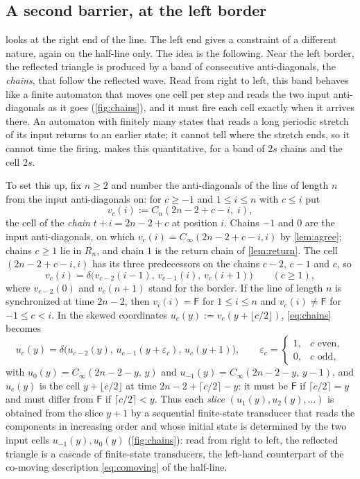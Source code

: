 \subsection{A second barrier, at the left border}\label{sec:leftborder}

 looks at the right end of the line. The left end gives a
constraint of a different nature, again on the half-line only. The idea is
the following. Near the left border, the reflected triangle is produced by
a band of consecutive anti-diagonals, the \emph{chains}, that follow the
reflected wave. Read from right to left, this band behaves like a finite
automaton that moves one cell per step and reads the two input
anti-diagonals as it goes (\cref{fig:chains}), and it must fire each cell
exactly when it arrives there. An automaton with finitely many states that
reads a long periodic stretch of its input returns to an earlier state; it
cannot tell where the stretch ends, so it cannot time the firing.
 makes this quantitative, for a band of $2s$ chains and the
cell $2s$.

To set this up, fix $n\ge2$ and number the anti-diagonals of the line of
length $n$ from the input anti-diagonals on: for $c\ge-1$ and $1\le i\le n$ with $c\le i$ put
\[
v_c(i):=C_n(2n-2+c-i,\;i),
\]
the cell of the \emph{chain} $t+i=2n-2+c$ at position $i$. Chains $-1$ and
$0$ are the input anti-diagonals, on which $v_c(i)=C_\infty(2n-2+c-i,i)$ by
\cref{lem:agree}; chains $c\ge1$ lie in $R_n$, and chain $1$ is the return
chain of \cref{lem:return}. The cell $(2n-2+c-i,i)$ has its three
predecessors on the chains $c-2$, $c-1$ and $c$, so
\begin{equation}\label{eq:chains}
v_c(i)=\delta\bigl(v_{c-2}(i-1),\,v_{c-1}(i),\,v_c(i+1)\bigr)\qquad(c\ge1),
\end{equation}
where $v_{c-2}(0)$ and $v_c(n+1)$ stand for the border. If the line of
length $n$ is synchronized at time $2n-2$, then $v_i(i)=\mathsf F$ for
$1\le i\le n$ and $v_c(i)\ne\mathsf F$ for $-1\le c<i$. In the skewed coordinates
$u_c(y):=v_c(y+\lfloor c/2\rfloor)$, \eqref{eq:chains} becomes
\begin{equation}\label{eq:slices}
u_c(y)=\delta\bigl(u_{c-2}(y),\,u_{c-1}(y+\varepsilon_c),\,u_c(y+1)\bigr),
\qquad \varepsilon_c=\begin{cases}1,&c\text{ even},\\0,&c\text{ odd},\end{cases}
\end{equation}
with $u_0(y)=C_\infty(2n-2-y,\,y)$ and $u_{-1}(y)=C_\infty(2n-2-y,\,y-1)$,
and $u_c(y)$ is the cell $y+\lfloor c/2\rfloor$ at time
$2n-2+\lceil c/2\rceil-y$: it must be $\mathsf F$ if $\lceil c/2\rceil=y$
and must differ from $\mathsf F$ if $\lceil c/2\rceil<y$. Thus each \emph{slice}
$(u_1(y),u_2(y),\dots)$ is obtained from the slice $y+1$ by a sequential
finite-state transducer that reads the components in increasing order and
whose initial state is determined by the two input cells
$u_{-1}(y),u_0(y)$ (\cref{fig:chains}): read from right to left, the
reflected triangle is a cascade of finite-state transducers, the left-hand
counterpart of the co-moving description \eqref{eq:comoving} of the
half-line.


